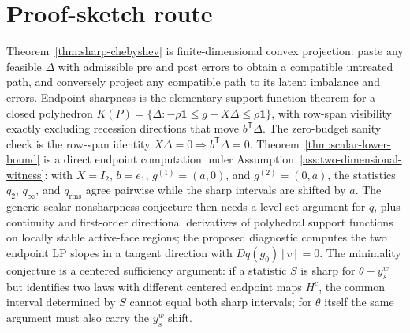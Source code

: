 \documentclass[11pt]{article}
\newcommand{\one}{\mathbf{1}}
\newcommand{\transpose}{\mathsf{T}}
\theoremstyle{definition}
\theoremstyle{plain}
\theoremstyle{remark}
\begin{document}
\section{Proof-sketch route}
Theorem~\ref{thm:sharp-chebyshev} is finite-dimensional convex projection: paste any feasible \(\Delta\) with admissible pre and post errors to obtain a compatible untreated path, and conversely project any compatible path to its latent imbalance and errors. Endpoint sharpness is the elementary support-function theorem for a closed polyhedron \(K(P)=\{\Delta:-\rho\one\le g-X\Delta\le\rho\one\}\), with row-span visibility exactly excluding recession directions that move \(b^\transpose\Delta\). The zero-budget sanity check is the row-span identity \(X\Delta=0\Rightarrow b^\transpose\Delta=0\). Theorem~\ref{thm:scalar-lower-bound} is a direct endpoint computation under Assumption~\ref{ass:two-dimensional-witness}: with \(X=I_2\), \(b=e_1\), \(g^{(1)}=(a,0)\), and \(g^{(2)}=(0,a)\), the statistics \(q_2\), \(q_\infty\), and \(q_{\mathrm{rms}}\) agree pairwise while the sharp intervals are shifted by \(a\). The generic scalar nonsharpness conjecture then needs a level-set argument for \(q\), plus continuity and first-order directional derivatives of polyhedral support functions on locally stable active-face regions; the proposed diagnostic computes the two endpoint LP slopes in a tangent direction with \(Dq(g_0)[v]=0\). The minimality conjecture is a centered sufficiency argument: if a statistic \(S\) is sharp for \(\theta-y_s^w\) but identifies two laws with different centered endpoint maps \(H^c\), the common interval determined by \(S\) cannot equal both sharp intervals; for \(\theta\) itself the same argument must also carry the \(y_s^w\) shift.
\end{document}
